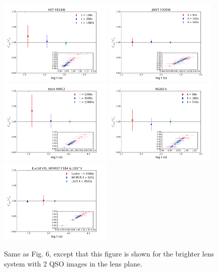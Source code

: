 \documentclass[a4paper,11pt]{article}
\begin{document}
\begin{figure}
\begin{center}
\includegraphics[width=0.48\textwidth]{gamma_0330_2QSOimages_HST.png}
\includegraphics[width=0.48\textwidth]{gamma_0330_2QSOimages_JWST.png} \\
\includegraphics[width=0.48\textwidth]{gamma_0330_2QSOimages_Keck.png}
\includegraphics[width=0.48\textwidth]{gamma_0330_2QSOimages_NGAO.png} \\
\includegraphics[width=0.48\textwidth]{gamma_0330_2QSOimages_E_W_L.png}
\end{center}
\caption{Same as Fig. 6, except that this figure is shown for the brighter lens system with 2 QSO images in the lens plane.} 
\label{fig:gamma_brighter_2QSOimages}
\end{figure}
\end{document}

